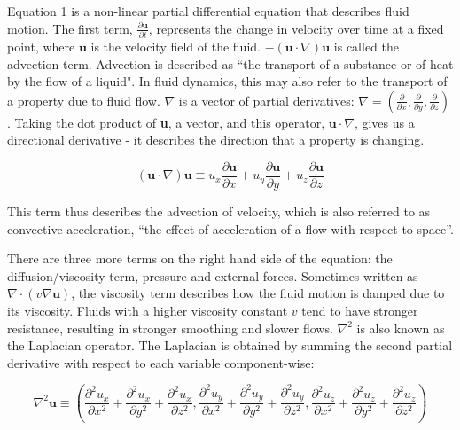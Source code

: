 \documentclass[12pt]{article}
\begin{document}
    Equation 1 is a non-linear partial differential equation that describes fluid motion\cite{slides}. The first term, $\frac{\partial{\textbf{u}}}{\partial{t}}$, represents the change in velocity over time at a fixed point, where $\textbf{u}$ is the velocity field of the fluid. $-(\textbf{u}\cdot\nabla)\textbf{u}$ is called the advection term. Advection is described as ``the transport of a substance or of heat by the flow of a liquid"\cite{cambridge}. In fluid dynamics, this may also refer to the transport of a property due to fluid flow. $\nabla$ is a vector of partial derivatives: $\nabla = (\frac{\partial}{\partial x}, \frac{\partial}{\partial y}, \frac{\partial}{\partial z})$. Taking the dot product of \textbf{u}, a vector, and this operator, $\textbf{u}\cdot\nabla$, gives us a directional derivative - it describes the direction that a property is changing.

    \begin{equation*}
        (\textbf{u}\cdot\nabla)\textbf{u} \equiv u_x \frac{\partial \textbf{u}}{\partial x} + u_y \frac{\partial \textbf{u}}{\partial y} + u_z \frac{\partial \textbf{u}}{\partial z}
    \end{equation*}

    This term thus describes the advection of velocity, which is also referred to as convective acceleration, ``the effect of acceleration of a flow with respect to space''\cite{nswikipedia}.

    There are three more terms on the right hand side of the equation: the diffusion/viscosity term, pressure and external forces. Sometimes written as $\nabla \cdot (v\nabla\textbf{u})$, the viscosity term describes how the fluid motion is damped due to its viscosity. Fluids with a higher viscosity constant $v$ tend to have stronger resistance, resulting in stronger smoothing and slower flows. $\nabla^2$ is also known as the Laplacian operator. The Laplacian is obtained by summing the second partial derivative with respect to each variable component-wise:

    \begin{equation*}
        \nabla^2\textbf{u} \equiv (\frac{\partial^2{u_x}}{\partial{x^2}} + \frac{\partial^2{u_x}}{\partial{y^2}} + \frac{\partial^2{u_x}}{\partial{z^2}}, \frac{\partial^2{u_y}}{\partial{x^2}} + \frac{\partial^2{u_y}}{\partial{y^2}} + \frac{\partial^2{u_y}}{\partial{z^2}}, \frac{\partial^2{u_z}}{\partial{x^2}} + \frac{\partial^2{u_z}}{\partial{y^2}} + \frac{\partial^2{u_z}}{\partial{z^2}})
    \end{equation*}
\end{document}
